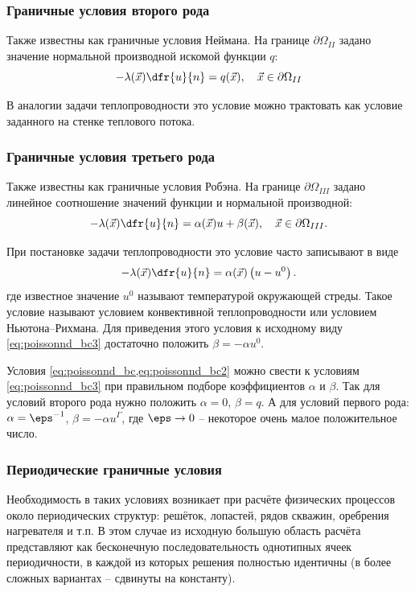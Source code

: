 \subsubsection{Граничные условия второго рода}
Также известны как граничные условия Неймана.
На границе $\partial \Omega_{II}$ задано значение нормальной производной искомой функции $q$:
\begin{equation}
\label{eq:poissonnd_bc2}
-\lambda(\vec x)\dfr{u}{n} = q(\vec x), \quad \vec x \in \partial\Omega_{II}
\end{equation}

В аналогии задачи теплопроводности это условие можно трактовать как условие заданного на стенке теплового потока.

\subsubsection{Граничные условия третьего рода}
Также известны как граничные условия Робэна.
На границе $\partial \Omega_{III}$ задано линейное соотношение значений функции и нормальной производной:
\begin{equation}
\label{eq:poissonnd_bc3}
-\lambda(\vec x)\dfr{u}{n} = \alpha(\vec x) u + \beta(\vec x), \quad \vec x \in \partial\Omega_{III}.
\end{equation}

При постановке задачи теплопроводности это условие часто записывают в виде
$$
-\lambda(\vec x)\dfr{u}{n} = \alpha(\vec x)\left(u - u^0\right).
$$
где известное значение $u^0$ называют температурой окружающей стреды.
Такое условие называют условием конвективной теплопроводности или условием Ньютона--Рихмана.
Для приведения этого условия к исходному виду \cref{eq:poissonnd_bc3} достаточно положить $\beta = -\alpha u^0$.

Условия \cref{eq:poissonnd_bc,eq:poissonnd_bc2}
можно свести к условиям \cref{eq:poissonnd_bc3}
при правильном подборе коэффициентов $\alpha$ и $\beta$.
Так для условий второго рода нужно положить $\alpha=0$, $\beta=q$.
А для условий первого рода: $\alpha=\eps^{-1}$, $\beta = -\alpha u^\Gamma$,
где $\eps\to 0$ -- некоторое очень малое положительное число.

\subsubsection{Периодические граничные условия}
Необходимость в таких условиях
возникает при расчёте физических процессов
около периодических структур: решёток, лопастей, рядов скважин, оребрения нагревателя и т.п.
В этом случае из исходную большую область расчёта
представляют как бесконечную последовательность однотипных ячеек периодичности, 
в каждой из которых решения полностью идентичны (в более сложных вариантах -- сдвинуты на константу).


